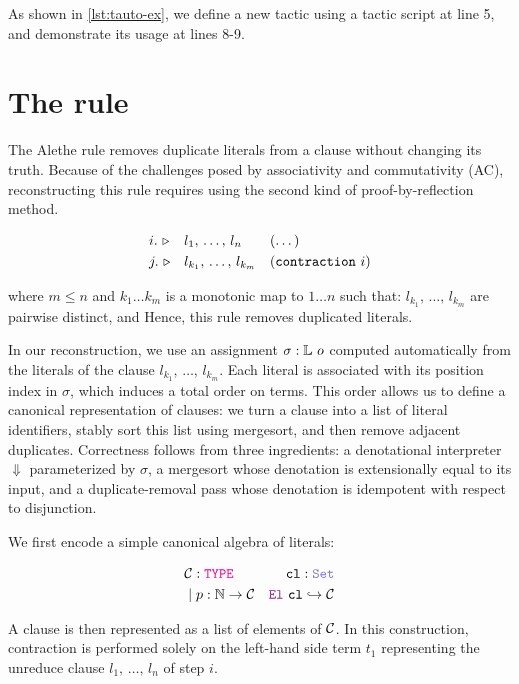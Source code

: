 As shown in \cref{lst:tauto-ex}, we define a new tactic  using a tactic script at line 5, and demonstrate its usage at lines 8-9.


\section{The \texttt{} rule}
\label{sec:contraction-recon}

The Alethe rule  removes duplicate literals from a clause without changing its truth.
Because of the challenges posed by associativity and commutativity (AC), reconstructing this rule requires using the second kind of proof-by-reflection method.

\begin{align*}
&i.~\triangleright &  &l_1,\, \dots,\, l_{n}       & & (\dots)  \\
&j.~\triangleright &  &l_{k_1},\, \dots,\, l_{k_m} & & (\kw{contraction}~i) 
\end{align*}

where $m \leq n$ and $k_1 \dots k_m$ is a monotonic map to $1 \dots n$ such that: $l_{k_1},\, \dots,\, l_{k_m}$ are pairwise distinct, and Hence, this rule removes duplicated literals.

In our reconstruction, we use an assignment $\sigma: \bb{L}~o$ computed automatically from the literals of the clause $l_{k_1},\, \dots,\, l_{k_m}$.
Each literal is associated with its position index in $\sigma$, which induces a total order on terms. 
This order allows us to define a canonical representation of clauses: we turn a clause into a list of literal identifiers, stably sort this list using mergesort, and then remove adjacent duplicates.  
Correctness follows from three ingredients: a denotational interpreter $\Downarrow$ parameterized by $\sigma$, a mergesort whose denotation is extensionally equal to its input, and a duplicate-removal pass whose denotation is idempotent with respect to disjunction.

We first encode a simple canonical algebra of literals:

\begin{align*}
&\cal{C} : \type & \kw{cl}: \set  \\
&\pipe p : \N \ra \cal{C} &\el~\kw{cl} \re \cal{C}
\end{align*}

A clause is then represented as a list of elements of $\cal{C}$.
In this construction, contraction is performed solely on the left-hand side term $t_1$ representing the unreduce clause $l_1,\, \dots,\, l_{n}$ of step $i$.

